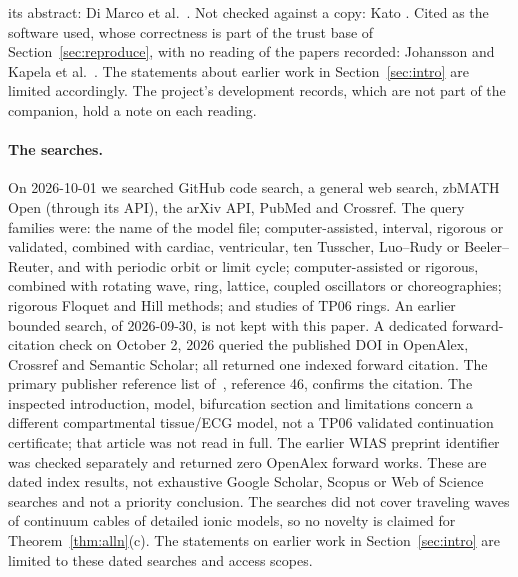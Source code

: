 \documentclass[11pt]{article}
\theoremstyle{definition}
\begin{document}
its abstract: Di Marco et al.\ \cite{dmfgkp2016}. Not checked against a copy: Kato \cite{kato1976}. Cited as the software used, whose correctness is part of the trust base of Section~\ref{sec:reproduce}, with no reading of the papers recorded: Johansson \cite{johansson2017} and Kapela et al.\ \cite{capd2021}. The statements about earlier work in Section~\ref{sec:intro} are limited accordingly. The project's development records, which are not part of the companion, hold a note on each reading.

\paragraph{The searches.} On 2026-10-01 we searched GitHub code search, a general web search, zbMATH Open (through its API), the arXiv API, PubMed and Crossref. The query families were: the name of the model file; computer-assisted, interval, rigorous or validated, combined with cardiac, ventricular, ten Tusscher, Luo--Rudy or Beeler--Reuter, and with periodic orbit or limit cycle; computer-assisted or rigorous, combined with rotating wave, ring, lattice, coupled oscillators or choreographies; rigorous Floquet and Hill methods; and studies of TP06 rings. An earlier bounded search, of 2026-09-30, is not kept with this paper. A dedicated forward-citation check on October 2, 2026 queried the published DOI in OpenAlex, Crossref and Semantic Scholar; all returned one indexed forward citation. The primary publisher reference list of~\cite{isa2026}, reference 46, confirms the citation. The inspected introduction, model, bifurcation section and limitations concern a different compartmental tissue/ECG model, not a TP06 validated continuation certificate; that article was not read in full. The earlier WIAS preprint identifier was checked separately and returned zero OpenAlex forward works. These are dated index results, not exhaustive Google Scholar, Scopus or Web of Science searches and not a priority conclusion. The searches did not cover traveling waves of continuum cables of detailed ionic models, so no novelty is claimed for Theorem~\ref{thm:alln}(c). The statements on earlier work in Section~\ref{sec:intro} are limited to these dated searches and access scopes.
\end{document}
